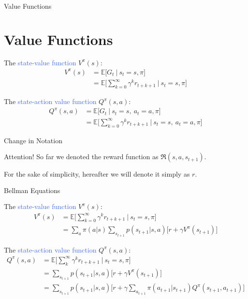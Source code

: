 \documentclass{beamer}
\begin{document}


\begin{frame}{Value Functions}
\section{Value Functions}

The \textcolor{RoyalBlue}{state-value function} $V^{\pi}(s)$:
\begin{align*}
	V^{\pi}(s) & = \mathds{E} \bigg[G_t \: \big| \: s_t=s,\pi \bigg] \\ 
		& = \mathds{E} \bigg[\sum_{k=0}^{\infty}\gamma^{k} r_{t+k+1} \: \bigg| \: s_t=s,\pi \bigg]
\end{align*}

The \textcolor{RoyalBlue}{state-action value function} $Q^{\pi}(s,a)$:
\begin{align*}
	Q^{\pi}(s,a) & = \mathds{E} \bigg[G_t \: \big| \: s_t=s, \: a_t=a,  \pi \bigg] \\ 
		& = \mathds{E} \bigg[\sum_{k=0}^{\infty}\gamma^{k} r_{t+k+1} \: \bigg| \: s_t=s, \: a_t=a, \pi \bigg]
\end{align*}
		
\end{frame}

\begin{frame}{Change in Notation}

\begin{block}{Attention!}
So far we denoted the reward function as $\Re(s, a, s_{t+1})$.

For the sake of simplicity, hereafter we will denote it simply as $r$.
\end{block}
\end{frame}



\begin{frame}{Bellman Equations}


The \textcolor{RoyalBlue}{state-value function} $V^{\pi}(s)$:
\begin{align*}
V^{\pi}(s) & = \mathds{E} \bigg[\sum_{k=0}^{\infty}\gamma^{k} r_{t+k+1} \: \bigg| \: s_t=s,\pi \bigg] \\
   & = \sum_a \pi(a|s) \sum_{s_{t+1}} p(s_{t+1}|s,a)\big[r + \gamma V^{\pi}(s_{t+1}) \big] 
\end{align*}

The \textcolor{RoyalBlue}{state-action value function} $Q^{\pi}(s,a)$:
\begin{align*}
	Q^{\pi}(s,a) & = \mathds{E} \bigg[\sum_{k}^{\infty}\gamma^{k} r_{t+k+1} \: \bigg| \: s_t=s,\pi \bigg] \\
	& = \sum_{s_{t+1}} p(s_{t+1}|s,a)\big[r + \gamma V^{\pi}(s_{t+1}) \big] \\
	& = \sum_{s_{t+1}} p(s_{t+1}|s,a)\big[r + \gamma \sum_{a_{t+1}} \pi(a_{t+1}|s_{t+1}) Q^{\pi}(s_{t+1}, a_{t+1}) \big]
\end{align*}
		
\end{frame}
\end{document}
